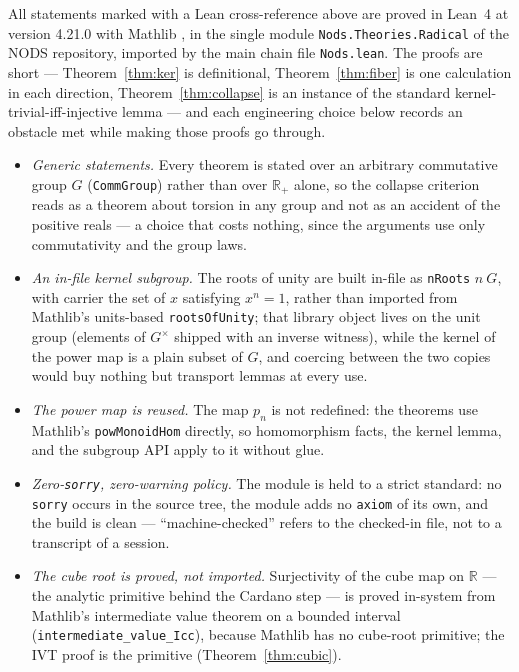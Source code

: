 \documentclass[submission,noinfoline]{jsfds}
\begin{document}
All statements marked with a Lean cross-reference above are proved in
Lean~4 \citep{deMoura2015} at version 4.21.0 with Mathlib
\citep{MathlibCommunity2020}, in the single module
\texttt{Nods.Theories.}\allowbreak\texttt{Radical} of the NODS repository,
imported by the main chain file \texttt{Nods.lean}. The proofs are short
--- Theorem~\ref{thm:ker} is definitional, Theorem~\ref{thm:fiber} is
one calculation in each direction, Theorem~\ref{thm:collapse} is an
instance of the standard kernel-trivial-iff-injective lemma --- and each
engineering choice below records an obstacle met while making those
proofs go through.
\begin{itemize}
\item \emph{Generic statements.} Every theorem is stated over an
arbitrary commutative group $G$ (\texttt{CommGroup}) rather than over
$\mathbb R_+$ alone, so the collapse criterion reads as a theorem about
torsion in any group and not as an accident of the positive reals --- a
choice that costs nothing, since the arguments use only commutativity
and the group laws.
\item \emph{An in-file kernel subgroup.} The roots of unity are built
in-file as \texttt{nRoots} $n\ G$, with carrier the set of $x$
satisfying $x^n=1$, rather than imported from Mathlib's units-based
\texttt{rootsOfUnity}; that library object lives on the unit group
(elements of $G^\times$ shipped with an inverse witness), while the
kernel of the power map is a plain subset of $G$, and coercing between
the two copies would buy nothing but transport lemmas at every use.
\item \emph{The power map is reused.} The map $p_n$ is not redefined:
the theorems use Mathlib's \texttt{powMonoidHom} directly, so
homomorphism facts, the kernel lemma, and the subgroup API apply to it
without glue.
\item \emph{Zero-\texttt{sorry}, zero-warning policy.} The module is
held to a strict standard: no \texttt{sorry} occurs in the source tree,
the module adds no \texttt{axiom} of its own, and the build is clean ---
``machine-checked'' refers to the checked-in file, not to a transcript
of a session.
\item \emph{The cube root is proved, not imported.} Surjectivity of the
cube map on $\mathbb R$ --- the analytic primitive behind the Cardano
step --- is proved in-system from Mathlib's intermediate value theorem
on a bounded interval (\texttt{intermediate\_value\_Icc}), because
Mathlib has no cube-root primitive; the IVT proof is the primitive
(Theorem~\ref{thm:cubic}).

\end{itemize}
\end{document}
